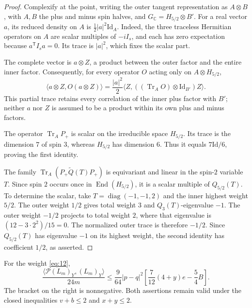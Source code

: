 \begin{proof}
Complexify at the point, writing the outer tangent representation as
\(A\otimes B\), with \(A,B\) the plus and minus spin halves, and
\(G_{\mathbb C}=H_{5/2}\otimes B'\).
For a real vector \(a\), its reduced density on \(A\) is
\(\frac12|a|^2\mathrm{Id}_A\).  Indeed, the three traceless Hermitian
operators on \(A\) are scalar multiples of \(-iI_s\), and each has
zero expectation because \(a^{\mathsf T}I_sa=0\).
Its trace is \(|a|^2\), which fixes the scalar part.

The complete vector is \(a\otimes Z\), a product between the outer
factor and the entire inner factor.  Consequently, for every operator
\(O\) acting only on \(A\otimes H_{5/2}\),
\[
 \langle a\otimes Z,O(a\otimes Z)\rangle
 =\frac{|a|^2}{2}
    \langle Z,((\operatorname{Tr}_A O)\otimes\mathrm{Id}_{B'})Z\rangle.
\]
This partial trace retains every correlation of the inner plus factor
with \(B'\); neither \(a\) nor \(Z\) is assumed to be a product within
its own plus and minus factors.

The operator \(\operatorname{Tr}_A P_+\) is scalar on the irreducible
space \(H_{5/2}\).  Its trace is the dimension \(7\) of spin \(3\),
whereas \(H_{5/2}\) has dimension \(6\).  Thus it equals
\(7\mathrm{Id}/6\), proving the first identity.

The family
\(\operatorname{Tr}_A(P_+\widetilde Q(T)P_+)\) is equivariant and
linear in the spin-\(2\) variable \(T\).  Since spin \(2\) occurs once
in \(\operatorname{End}(H_{5/2})\), it is a scalar multiple of
\(Q_{5/2}(T)\).  To determine the scalar, take
\(T=\operatorname{diag}(-1,-1,2)\) and the inner highest weight
\(5/2\).  The outer weight \(1/2\) gives total weight \(3\) and
\(Q_3(T)\)-eigenvalue \(-1\).  The outer weight \(-1/2\) projects to
total weight \(2\), where that eigenvalue is
\((12-3\cdot2^2)/15=0\).  The normalized outer trace is therefore
\(-1/2\).  Since \(Q_{5/2}(T)\) has eigenvalue \(-1\) on its highest
weight, the second identity has coefficient \(1/2\), as asserted.
\end{proof}

\begin{proposition}
\label{prop:hessian-projection-cost}
For the weight \eqref{eq:12},
\begin{equation}
 \frac{\langle\mathcal P(L_m)_Y,(L_m)_Y\rangle}{24m}
 \le\frac9{64}|p-q|^2
       \left[\frac7{12}(4+y)e-\frac54B\right].
 \tag{14}\label{eq:14}
\end{equation}
The bracket on the right is nonnegative.  Both assertions remain valid
under the closed inequalities \(v+b\le2\) and \(x+y\le2\).
\end{proposition}

